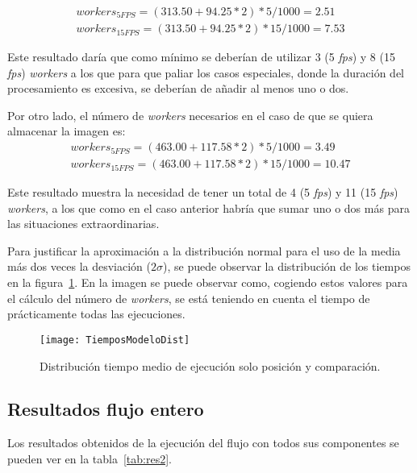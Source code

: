 {\begin{equation}
\begin{split}
workers_{5FPS} = (313.50 + 94.25*2)*5/1000 = 2.51\\
workers_{15FPS} = (313.50 + 94.25*2)*15/1000 = 7.53
\end{split}
\end{equation}

Este resultado daría que como mínimo se deberían de utilizar 3 (5 \textit{fps}) y 8 (15 \textit{fps}) \textit{workers} a los que para que paliar los casos especiales, donde la duración del procesamiento es excesiva, se deberían de añadir al menos uno o dos.

Por otro lado, el número de \textit{workers} necesarios en el caso de que se quiera almacenar la imagen es:
\begin{equation}
\begin{split}
workers_{5FPS} = (463.00 + 117.58*2)*5/1000 = 3.49\\
workers_{15FPS} = (463.00 + 117.58*2)*15/1000 = 10.47
\end{split}
\end{equation}

Este resultado muestra la necesidad de tener un total de 4 (5 \textit{fps}) y 11 (15 \textit{fps}) \textit{workers}, a los que como en el caso anterior habría que sumar uno o dos más para las situaciones extraordinarias.

Para justificar la aproximación a la distribución normal para el uso de la media más dos veces la desviación ($2\sigma$), se puede observar la distribución de los tiempos en la figura~\ref{fig:dist1}. En la imagen se puede observar como, cogiendo estos valores para el cálculo del número de \textit{workers}, se está teniendo en cuenta el tiempo de prácticamente todas las ejecuciones.

\begin{figure}[h]
	\centering
	\texttt{[image: TiemposModeloDist]}
	\caption{Distribución tiempo medio de ejecución solo posición y comparación.}
	\label{fig:dist1}
\end{figure}

\subsection{Resultados flujo entero}
Los resultados obtenidos de la ejecución del flujo con todos sus componentes se pueden ver en la tabla~\ref{tab:res2}.

}
